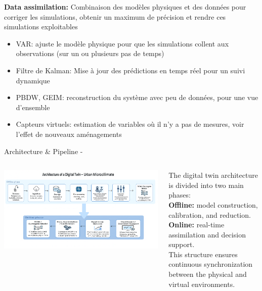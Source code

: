 \documentclass{beamer}
\begin{document}
\begin{frame}
    \small
    \textbf{Data assimilation:} Combinaison des modèles physiques et des données pour corriger les simulations, obtenir un maximum de précision et rendre ces simulations exploitables %
    \vspace{0.2cm}
    \begin{itemize}
        \item VAR: ajuste le modèle physique pour que les simulations collent aux observations (sur un ou plusieurs pas de temps)
        \item Filtre de Kalman: Mise à jour des prédictions en temps réel pour un suivi dynamique
        \item PBDW, GEIM: reconstruction du système avec peu de données, pour une vue d'ensemble
        \item Capteurs virtuels: estimation de variables où il n'y a pas de mesures, voir l'effet de nouveaux aménagements
    \end{itemize}
\end{frame}

\begin{frame}{Architecture & Pipeline - }
\begin{columns}
    \begin{column}{0.55\textwidth}
        \includegraphics[width=\linewidth]{images/architecture_of_digital_twin.png}
    \end{column}
    \begin{column}{0.45\textwidth}
        \small
        The digital twin architecture is divided into two main phases:\\[4pt]
        \textbf{Offline:} model construction, calibration, and reduction.\\[3pt]
        \textbf{Online:} real-time assimilation and decision support.\\[4pt]
        This structure ensures continuous synchronization between the physical and virtual environments.
    \end{column}
\end{columns}
\end{frame}
\end{document}

